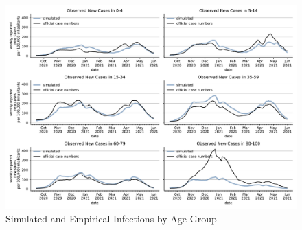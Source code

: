 \begin{figure}[ht]
\centering
  \includegraphics[width=\textwidth]{../figures/results/figures/incidences_by_group/age_group_rki/full_combined_baseline_new_known_case}
\caption{Simulated and Empirical Infections by Age Group}
\label{fig:age_group_fit}
\end{figure}


